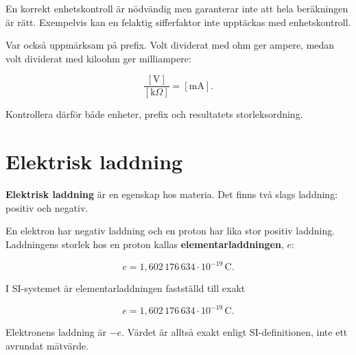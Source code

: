 \documentclass[
  swedish,
  11pt,
  a4paper,
  DIV=11,
  numbers=noendperiod,
  twoside,
  open=any]{scrreprt}
\begin{document}
\begin{tcolorbox}[enhanced jigsaw, arc=.35mm, bottomrule=.15mm, bottomtitle=1mm, breakable, colback=white, colbacktitle=quarto-callout-tip-color!10!white, colframe=quarto-callout-tip-color-frame, coltitle=black, left=2mm, leftrule=.75mm, opacityback=0, opacitybacktitle=0.6, rightrule=.15mm, title=\textcolor{quarto-callout-tip-color}{\faLightbulb}\hspace{0.5em}{Kontrollera enheterna -- men också prefixen}, titlerule=0mm, toprule=.15mm, toptitle=1mm]

En korrekt enhetskontroll är nödvändig men garanterar inte att hela
beräkningen är rätt. Exempelvis kan en felaktig sifferfaktor inte
upptäckas med enhetskontroll.

Var också uppmärksam på prefix. Volt dividerat med ohm ger ampere, medan
volt dividerat med kiloohm ger milliampere:

\[
\frac{[\mathrm{V}]}{[\mathrm{k}\Omega]} = [\mathrm{mA}].
\]

Kontrollera därför både enheter, prefix och resultatets storleksordning.

\end{tcolorbox}

\section{Elektrisk laddning}\label{sec-grunder-elektrisk-laddning}

\textbf{Elektrisk laddning} är en egenskap hos materia. Det finns två
slags laddning: positiv och negativ.

En elektron har negativ laddning och en proton har lika stor positiv
laddning. Laddningens storlek hos en proton kallas
\textbf{elementarladdningen}, \(e\):

\[
e = 1{,}602\,176\,634 \cdot 10^{-19}\,\mathrm{C}.
\]

\begin{tcolorbox}[enhanced jigsaw, arc=.35mm, bottomrule=.15mm, bottomtitle=1mm, breakable, colback=white, colbacktitle=quarto-callout-important-color!10!white, colframe=quarto-callout-important-color-frame, coltitle=black, left=2mm, leftrule=.75mm, opacityback=0, opacitybacktitle=0.6, rightrule=.15mm, title=\textcolor{quarto-callout-important-color}{\faExclamation}\hspace{0.5em}{Ett exakt värde i SI}, titlerule=0mm, toprule=.15mm, toptitle=1mm]

I SI-systemet är elementarladdningen fastställd till exakt

\[
e = 1{,}602\,176\,634 \cdot 10^{-19}\,\mathrm{C}.
\]

Elektronens laddning är \(-e\). Värdet är alltså exakt enligt
SI-definitionen, inte ett avrundat mätvärde.

\end{tcolorbox}
\end{document}

